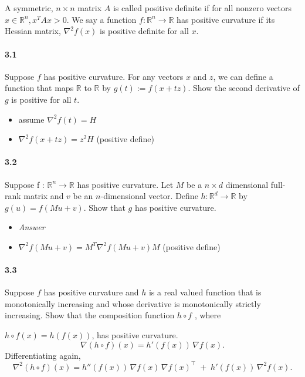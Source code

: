 \documentclass[a4paper]{article}
\begin{document}
\section{}
A symmetric, $n \times n$ matrix $A$ is called positive definite if for all nonzero vectors $x \in \mathbb{R}^n , x^T Ax > 0$.
We say a function $f : \mathbb{R}^n \rightarrow \mathbb{R}$ has positive curvature if its Hessian matrix, $\nabla^2 f(x)$ is positive definite for all $x$.
\paragraph{3.1}
Suppose $f$ has positive curvature. For any vectors $x$ and $z$, we can define a function that maps $\mathbb{R}$ to $\mathbb{R}$ by $g(t) := f (x + tz)$.
Show the second derivative of $g$ is positive for all $t$.
\begin{itemize}
    \item assume $\nabla^2 f(t) = H$
    \item $\nabla^2 f(x + tz) = z^2H$ (positive define)
\end{itemize}
\paragraph{3.2}
Suppose f : $\mathbb{R}^n \rightarrow \mathbb{R}$ has positive curvature.
Let $M$ be a $n \times d$ dimensional full-rank matrix and $v$ be an $n$-dimensional vector.
Define $h : \mathbb{R}^d \rightarrow \mathbb{R}$ by $g(u) = f (M u + v).$
Show that $g$ has positive curvature.

\begin{itemize}
    \item \emph{Answer}
    \item $\nabla^2 f(Mu+v) = M^T\nabla^2f(Mu+v)M$ (positive define)
\end{itemize}
\paragraph{3.3}
Suppose $f$ has positive curvature and $h$ is a real valued function that is monotonically increasing and
whose derivative is monotonically strictly increasing. Show that the composition function $h \circ f$ , where

$h \circ f (x) = h(f (x))$, has positive curvature.
$$\nabla (h\circ f)(x) = h'(f(x))\, \nabla f(x).$$
Differentiating again,
$$\nabla^2 (h\circ f)(x) = h''(f(x))\, \nabla f(x)\,\nabla f(x)^\top \;+\; h'(f(x))\, \nabla^2 f(x).$$
\end{document}
